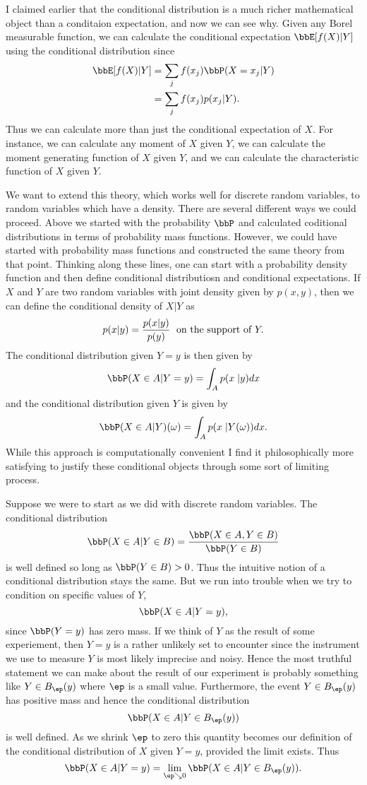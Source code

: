 \documentclass{report}
\begin{document}
I claimed earlier that the conditional distribution is a much richer mathematical object than a conditaion expectation, and now we can see why.  Given any Borel measurable function, we can calculate the conditional expectation $\bbE[f(X)|Y]$ using the conditional distribution since
\begin{align*}
\bbE[f(X)|Y] & = \sum_{j} f(x_j) \bbP(X = x_j | Y) \\
& = \sum_{j} f(x_j) p(x_j | Y).
\end{align*}
Thus we can calculate more than just the conditional expectation of $X$.  For instance, we can calculate any moment of $X$ given $Y$, we can calculate the moment generating function of $X$ given $Y$, and we can calculate the characteristic function of $X$ given $Y$.

We want to extend this theory, which works well for discrete random variables, to random variables which have a density.  There are several different ways we could proceed.  Above we started with the probability $\bbP$ and calculated coditional distributions in terms of probability mass functions.  However, we could have started with probability mass functions and constructed the same theory from that point.  Thinking along these lines, one can start with a probability density function and then define conditional distributiosn and conditional expectations.  If $X$ and $Y$ are two random variables with joint density given by $p(x,y)$, then we can define the conditional density of $X|Y$ as
\[
p(x|y) = \frac{p(x|y)}{p(y)} \; \textmd{ on the support of } Y.
\]
The conditional distribution given $Y=y$ is then given by
\[
\bbP(X \in A | Y = y) = \int_A p(x \; |y) dx
\]
and the conditional distribution given $Y$ is given by
\[
\bbP(X \in A | Y)(\omega) = \int_A p(x \; |Y(\omega)) dx.
\] 
While this approach is computationally convenient I find it philosophically more satisfying to justify these conditional objects through some sort of limiting process.

Suppose we were to start as we did with discrete random variables.  The conditional distribution
\[
\bbP(X \in A | Y \in B) = \frac{\bbP(X \in A, Y \in B)}{\bbP(Y \in B)}
\]
is well defined so long as $\bbP(Y \in B) > 0$.  Thus the intuitive notion of a conditional distribution stays the same.  But we run into trouble when we try to condition on specific values of $Y$,
\[
\bbP(X \in A | Y = y),
\]
since $\bbP(Y = y)$ has zero mass.  If we think of $Y$ as the result of some experiement, then $Y = y$ is a rather unlikely set to encounter since the instrument we use to measure $Y$ is most likely imprecise and noisy.  Hence the most truthful statement we can make about the result of our experiment is probably something like $Y \in B_\ep(y)$ where $\ep$ is a small value.  Furthermore, the event $Y \in B_\ep(y)$ has positive mass and hence the conditional distribution
\[
\bbP(X \in A | Y \in B_\ep(y))
\]
is well defined.  As we shrink $\ep$ to zero this quantity becomes our definition of the conditional distribution of $X$ given $Y = y$, provided the limit exists.  Thus
\[
\bbP(X \in A | Y = y) = \lim_{\ep \searrow 0} \bbP(X \in A | Y \in B_\ep(y)).
\]
\end{document}
